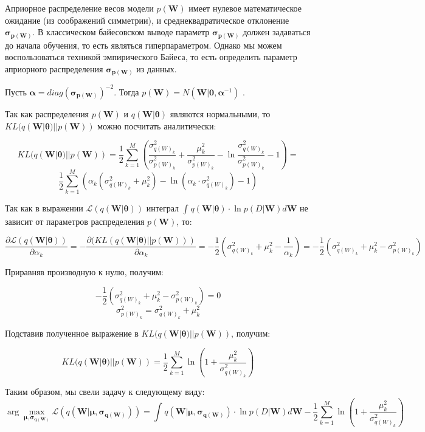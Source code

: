 \documentclass{article}
\newcommand{\argmax}{\arg\!\max}
\begin{document}
Априорное распределение весов модели $p(\mathbf{W})$ имеет нулевое математическое ожидание (из соображений симметрии), и среднеквадратическое отклонение $\pmb{\sigma_{p(\mathbf{W})}}$. В классическом байесовском выводе параметр $\pmb{\sigma_{p(\mathbf{W})}}$ должен задаваться до начала обучения, то есть являться гиперпараметром. Однако мы можем воспользоваться техникой эмпирического Байеса, то есть определить параметр  априорного распределения $\pmb{\sigma_{p(\mathbf{W})}}$ из данных.

Пусть $\pmb{\alpha} = diag(\pmb{\sigma_{p(\mathbf{W})}})^{-2}$. Тогда
$
p(\mathbf{W}) =
N(\mathbf{W} | \mathbf{0}, \pmb{\alpha}^{-1})$
.

Так как распределения $p(\mathbf{W})$ и $q(\mathbf{W} | \pmb{\theta})$ являются нормальными, то $KL(q(\mathbf{W} | \pmb{\theta}) || p(\mathbf{W}))$ можно посчитать аналитически:

\[
KL(q(\mathbf{W} | \pmb{\theta}) || p(\mathbf{W})) =
\dfrac{1}{2}\sum_{k=1}^{M}(\dfrac{\sigma_{{q(W)_{k}}}^2}{\sigma_{{p(W)_{k}}}^2} + \dfrac{\mu_{k}^2}{\sigma_{{p(W)_{k}}}^2} - \ln{\dfrac{\sigma_{{q(W)_{k}}}^2}{\sigma_{{p(W)_{k}}}^2}} - 1) =
\]\[
\dfrac{1}{2}\sum_{k=1}^{M}(\alpha_k (\sigma_{{q(W)_{k}}}^2 + \mu_{k}^2) - \ln{(\alpha_k \cdot \sigma_{{q(W)_{k}}}^2)} - 1)
\]

Так как в выражении
$\mathcal{L}(q(\mathbf{W} | \pmb{\theta}))$
интеграл
$\int_{}{} q(\mathbf{W} | \pmb{\theta}) \cdot \ln{p(D | \mathbf{W})} d\mathbf{W}$
не зависит от параметров распределения $p(\mathbf{W})$, то:

\[
\dfrac{\partial \mathcal{L}(q(\mathbf{W} | \pmb{\theta}))}{\partial {\alpha_k}} =
- \dfrac{\partial (KL(q(\mathbf{W} | \pmb{\theta}) || p(\mathbf{W})))}{\partial {\alpha_k}} =
-\dfrac{1}{2}(\sigma_{{q(W)_{k}}}^2 + \mu_{k}^2 - \dfrac{1}{\alpha_k}) =
-\dfrac{1}{2}(\sigma_{{q(W)_{k}}}^2 + \mu_{k}^2 - \sigma_{{p(W)_{k}}}^2)
\]

Приравняв производную к нулю, получим:

\[
-\dfrac{1}{2}(\sigma_{{q(W)_{k}}}^2 + \mu_{k}^2 - \sigma_{{p(W)_{k}}}^2) = 0
\]
\[
\sigma_{{p(W)_{k}}}^2 = \sigma_{{q(W)_{k}}}^2 + \mu_{k}^2
\]

Подставив полученное выражение в $KL(q(\mathbf{W} | \pmb{\theta}) || p(\mathbf{W}))$, получим:

\[
KL(q(\mathbf{W} | \pmb{\theta}) || p(\mathbf{W})) =
\dfrac{1}{2}\sum_{k=1}^{M}\ln({1 + \dfrac{\mu_{k}^2}{\sigma_{{q(W)_{k}}}^2}})
\]

Таким образом, мы свели задачу к следующему виду:
\[
\argmax_{\pmb{\mu}, \pmb{\sigma_{q(\mathbf{W})}}} \mathcal{L}(q(\mathbf{W} | \pmb{\mu}, \pmb{\sigma_{q(\mathbf{W})}})) =
\int_{}{} q(\mathbf{W} | \pmb{\mu}, \pmb{\sigma_{q(\mathbf{W})}}) \cdot \ln{p(D | \mathbf{W})} d\mathbf{W} - \dfrac{1}{2}\sum_{k=1}^{M}\ln({1 + \dfrac{\mu_{k}^2}{\sigma_{{q(W)_{k}}}^2}})
\]
\end{document}
